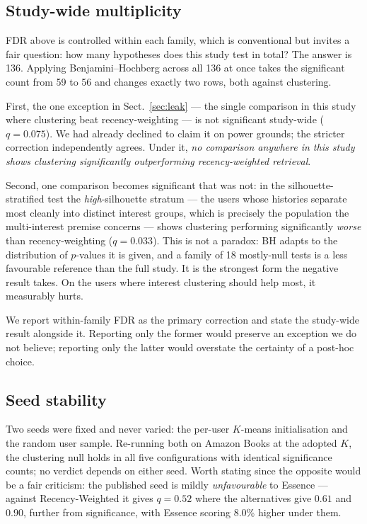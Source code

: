 \documentclass[runningheads,a4paper]{llncs}
\begin{document}
\subsection{Study-wide multiplicity}\label{sec:multi}

FDR above is controlled within each family, which is conventional but invites a fair
question: how many hypotheses does this study test in total? The answer is 136. Applying
Benjamini--Hochberg across all 136 at once takes the significant count from 59 to 56 and
changes exactly two rows, both against clustering.

First, the one exception in Sect.~\ref{sec:leak} --- the single comparison in this study where
clustering beat recency-weighting --- is not significant study-wide ($q = 0.075$). We had
already declined to claim it on power grounds; the stricter correction independently agrees.
Under it, \emph{no comparison anywhere in this study shows clustering significantly
outperforming recency-weighted retrieval}.

Second, one comparison becomes significant that was not: in the silhouette-stratified test the
\emph{high}-silhouette stratum --- the users whose histories separate most cleanly into
distinct interest groups, which is precisely the population the multi-interest premise
concerns --- shows clustering performing significantly \emph{worse} than recency-weighting
($q = 0.033$). This is not a paradox: BH adapts to the distribution of $p$-values it is given, and a
family of 18 mostly-null tests is a less favourable reference than the full study. It is the strongest form the negative result takes. On the
users where interest clustering should help most, it measurably hurts.

We report within-family FDR as the primary correction and state the study-wide result
alongside it. Reporting only the former would preserve an exception we do not believe;
reporting only the latter would overstate the certainty of a post-hoc choice.

\subsection{Seed stability}\label{sec:seeds}

Two seeds were fixed and never varied: the per-user $K$-means initialisation and the random
user sample. Re-running both on Amazon Books at the adopted $K$, the clustering null holds in
all five configurations with identical significance counts; no verdict depends on either
seed. Worth stating since the opposite would be a fair criticism: the published seed is
mildly \emph{unfavourable} to Essence --- against Recency-Weighted it gives $q = 0.52$
where the alternatives give $0.61$ and $0.90$, further from significance, with Essence
scoring 8.0\% higher under them.
\end{document}
